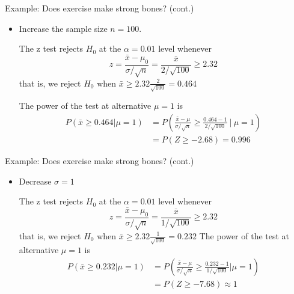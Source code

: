 \documentclass{beamer}\usepackage[]{graphicx}\usepackage[]{color}
\begin{document}
\begin{frame}{Example: Does exercise make strong bones? (cont.)}

\begin{itemize}
    \item Increase the sample size $n= 100$. \pause

      The z test rejects $H_0$ at the $\alpha =0.01$ level whenever
      \[ z=\frac{ \bar{x} - \mu_0}{\sigma/\sqrt{n}} =
      \frac{\bar{x}}{2/\sqrt{100}}\geq 2.32 \] that is, we reject
      $H_0$ when $\bar{x} \geq 2.32 \frac{2}{\sqrt{100}} = 0.464$ \pause

      The power of the test at alternative $\mu= 1 $ is
      \begin{align*}
        P(\bar{x} \geq 0.464 | \mu = 1)
        &= P(\frac{\bar{x} - \mu}{\sigma/\sqrt{n}} \geq
        \frac{0.464 -1}{2/\sqrt{100} }~| ~ \mu =1)\\
        &= P( Z \geq -2.68)= 0.996
      \end{align*}

\end{itemize}
\end{frame}

\begin{frame}{Example: Does exercise make strong bones? (cont.)}

\begin{itemize}
    \item Decrease $\sigma =1$ \pause

      The z test rejects $H_0$ at the $\alpha =0.01$ level whenever
      \[ z=\frac{ \bar{x} - \mu_0}{\sigma/\sqrt{n}} =
      \frac{\bar{x}}{1/\sqrt{100}}\geq 2.32 \] that is, we reject
      $H_0$ when $\bar{x} \geq 2.32 \frac{1}{\sqrt{100}} = 0.232$
\pause
      The power of the test at alternative $\mu= 1 $ is
      \begin{align*}
        P( \bar{x} \geq 0.232 | \mu = 1)
        &= P(\frac{\bar{x} - \mu}{\sigma/\sqrt{n}} \geq
        \frac{0.232 -1}{1/\sqrt{100}} | \mu =1) \\
 &= P( Z \geq -7.68) \approx 1
      \end{align*}

    \end{itemize}
\end{frame}
\end{document}
